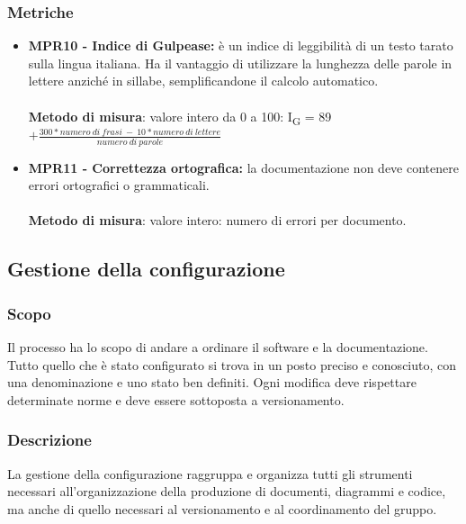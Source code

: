 \subsubsection{Metriche}
\begin{itemize}
    \item \textbf{MPR10 - Indice di Gulpease:}  è un indice di leggibilità di un testo tarato sulla lingua italiana. Ha il vantaggio di utilizzare la lunghezza delle parole in lettere anziché in sillabe, semplificandone il calcolo automatico.\\
          \\\textbf{Metodo di misura}: valore intero da 0 a 100: I\textsubscript{G} = 89 $+ \frac{300*numero \ di \ frasi \ - \ 10*numero \ di \ lettere}{numero \ di \ parole}$
    \item \textbf{MPR11 - Correttezza ortografica:}  la documentazione non deve contenere errori ortografici o grammaticali.\\
          \\\textbf{Metodo di misura}: valore intero: numero di errori per documento.
\end{itemize}
\subsection{Gestione della configurazione}
\subsubsection{Scopo}
Il processo ha lo scopo di andare a ordinare il software e la documentazione. Tutto quello che è stato configurato si trova in un posto preciso e conosciuto, con una denominazione e uno stato ben definiti. Ogni modifica deve rispettare determinate norme e deve essere sottoposta a versionamento.
\subsubsection{Descrizione}
La gestione della configurazione raggruppa e organizza tutti gli strumenti necessari all'organizzazione della produzione di documenti, diagrammi e codice, ma anche di quello necessari al versionamento e al coordinamento del gruppo.
